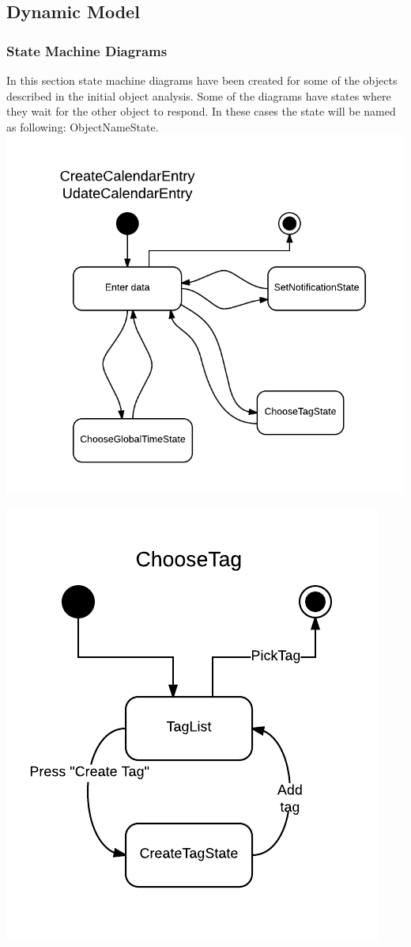 \subsection{Dynamic Model}
\subsubsection{State Machine Diagrams}
In this section state machine diagrams have been created for some of the objects described in the initial object analysis. Some of the diagrams have states where they wait for the other object to respond. In these cases the state will be named as following: ObjectNameState.\\

\includegraphics[scale=0.5]{CreateUpdateEntry-StateDiagram}

\includegraphics[scale=0.6]{ChooseTag-StateDiagram}

